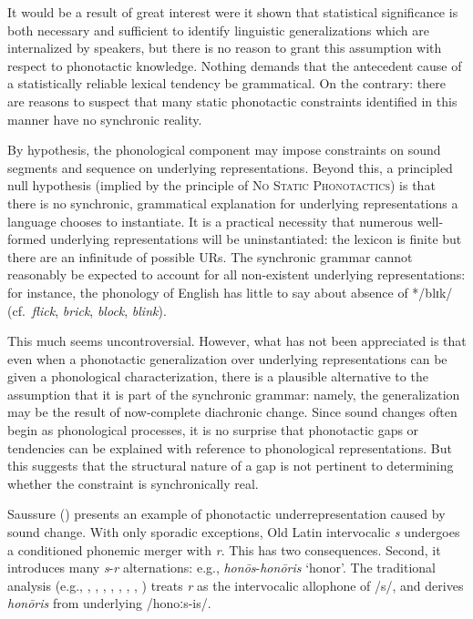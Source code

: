 It would be a result of great interest were it shown that statistical significance is both necessary and sufficient to identify linguistic generalizations which are internalized by speakers, but there is no reason to grant this assumption with respect to phonotactic knowledge.
Nothing demands that the antecedent cause of a statistically reliable lexical tendency be grammatical. 
On the contrary: there are reasons to suspect that many static phonotactic constraints identified in this manner have no synchronic reality.

By hypothesis, the phonological component may impose constraints on sound segments and sequence on underlying representations.
Beyond this, a principled null hypothesis (implied by the principle of \textsc{No Static Phonotactics}) is that there is no synchronic, grammatical explanation for underlying representations a language chooses to instantiate.
It is a practical necessity that numerous well-formed underlying representations will be uninstantiated: the lexicon is finite but there are an infinitude of possible URs.
The synchronic grammar cannot reasonably be expected to account for all non-existent underlying representations: for instance, the phonology of English has little to say about absence of */blɪk/ (cf.~\emph{flick}, \emph{brick}, \emph{block}, \emph{blink}).

This much seems uncontroversial.
However, what has not been appreciated is that even when a phonotactic generalization over underlying representations can be given a phonological characterization, there is a plausible alternative to the assumption that it is part of the synchronic grammar: namely, the generalization may be the result of now-complete diachronic change.
Since sound changes often begin as phonological processes, it is no surprise that phonotactic gaps or tendencies can be explained with reference to phonological representations.
But this suggests that the structural nature of a gap is not pertinent to determining whether the constraint is synchronically real.

Saussure (\citeyear{CLG}) presents an example of phonotactic underrepresentation caused by sound change.
With only sporadic exceptions, Old Latin intervocalic \emph{s} undergoes a conditioned phonemic merger with \emph{r}.
This has two consequences.
Second, it introduces many \emph{s}-\emph{r} alternations: e.g., \emph{honōs}-\emph{honōris} `honor'.
The traditional analysis (e.g., \citealt[62]{Foley1965}, \citealt[142]{Gruber2006}, \citealt[134]{Heslin1987}, \citealt[377]{Kenstowicz1996}, \citealt[314]{Klausenburger1976}, \citealt[19]{Matthews1972a}, \citealt[88]{Roberts2012}, \citealt[526]{Watkins1970}) treats \emph{r} as the intervocalic allophone of /s/, and derives \emph{honōris} from underlying /honoːs-is/.
 
